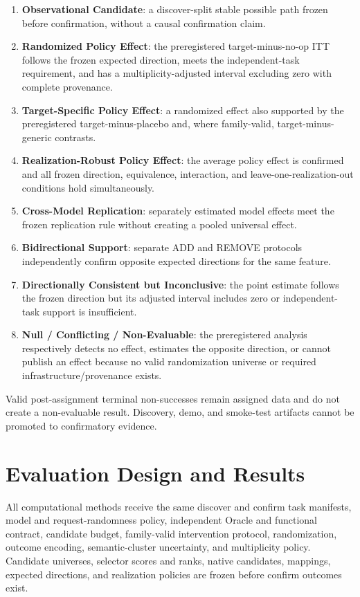\documentclass[acmsmall,screen,review,anonymous]{acmart}
\begin{document}
\begin{enumerate}
  \item \textbf{Observational Candidate}: a discover-split stable possible path
  frozen before confirmation, without a causal confirmation claim.
  \item \textbf{Randomized Policy Effect}: the preregistered
  target-minus-no-op ITT follows the frozen expected direction, meets the
  independent-task requirement, and has a multiplicity-adjusted interval
  excluding zero with complete provenance.
  \item \textbf{Target-Specific Policy Effect}: a randomized effect also supported by
  the preregistered target-minus-placebo and, where family-valid,
  target-minus-generic contrasts.
  \item \textbf{Realization-Robust Policy Effect}: the average policy effect
  is confirmed and all frozen direction, equivalence, interaction, and
  leave-one-realization-out conditions hold simultaneously.
  \item \textbf{Cross-Model Replication}: separately estimated model effects
  meet the frozen replication rule without creating a pooled universal effect.
  \item \textbf{Bidirectional Support}: separate ADD and REMOVE protocols
  independently confirm opposite expected directions for the same feature.
  \item \textbf{Directionally Consistent but Inconclusive}: the point estimate
  follows the frozen direction but its adjusted interval includes zero or
  independent-task support is insufficient.
  \item \textbf{Null / Conflicting / Non-Evaluable}: the preregistered analysis
  respectively detects no effect, estimates the opposite direction, or cannot
  publish an effect because no valid randomization universe or required
  infrastructure/provenance exists.
\end{enumerate}

Valid post-assignment terminal non-successes remain assigned data and do not
create a non-evaluable result. Discovery, demo, and smoke-test artifacts cannot
be promoted to confirmatory evidence.

\section{Evaluation Design and Results}

All computational methods receive the same discover and confirm task
manifests, model and request-randomness policy, independent Oracle and
functional contract, candidate budget, family-valid intervention protocol,
randomization, outcome encoding, semantic-cluster uncertainty, and
multiplicity policy. Candidate universes, selector scores and ranks, native
candidates, mappings, expected directions, and realization policies are frozen
before confirm outcomes exist.
\end{document}
